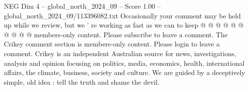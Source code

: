 \begin{textsample}{NEG Dim 4 – global\_north\_2024\_09 – Score 1.00 – global\_north\_2024\_09/113396082.txt}
Occasionally your comment may be held up while we review, but we ' re working as fast as we can to keep @ @ @ @ @ @ @ @ @ @ members-only content.
Please subscribe to leave a comment.
The Crikey comment section is members-only content.
Please login to leave a comment.
Crikey is an independent Australian source for news, investigations, analysis and opinion focusing on politics, media, economics, health, international affairs, the climate, business, society and culture.
We are guided by a deceptively simple, old idea : tell the truth and shame the devil.

\end{textsample}
